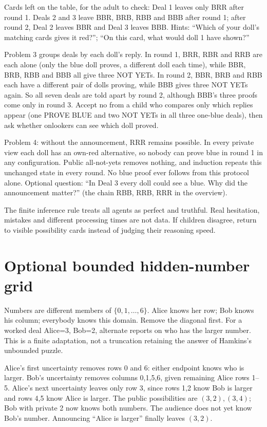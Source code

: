 \documentclass[11pt,letterpaper]{article}
\begin{document}
Cards left on the table, for the adult to check: Deal 1 leaves only BRR after round 1. Deals 2 and 3 leave BBR, BRB, RBB and BBB after round 1; after round 2, Deal 2 leaves BBR and Deal 3 leaves BBB. Hints: ``Which of your doll's matching cards gives it red?''; ``On this card, what would doll 1 have shown?''

Problem 3 groups deals by each doll's reply. In round 1, BRR, RBR and RRB are each alone (only the blue doll proves, a different doll each time), while BBR, BRB, RBB and BBB all give three NOT YETs. In round 2, BBR, BRB and RBB each have a different pair of dolls proving, while BBB gives three NOT YETs again. So all seven deals are told apart by round 2, although BBB's three proofs come only in round 3. Accept no from a child who compares only which replies appear (one PROVE BLUE and two NOT YETs in all three one-blue deals), then ask whether onlookers can see which doll proved.

Problem 4: without the announcement, RRR remains possible. In every private view each doll has an own-red alternative, so nobody can prove blue in round 1 in any configuration. Public all-not-yets removes nothing, and induction repeats this unchanged state in every round. No blue proof ever follows from this protocol alone. Optional question: ``In Deal 3 every doll could see a blue. Why did the announcement matter?'' (the chain RBB, RRB, RRR in the overview).

The finite inference rule treats all agents as perfect and truthful. Real hesitation, mistakes and different processing times are not data. If children disagree, return to visible possibility cards instead of judging their reasoning speed.
\newpage
\section*{Optional bounded hidden-number grid}
Numbers are different members of $\{0,1,\ldots,6\}$. Alice knows her row; Bob knows his column; everybody knows this domain. Remove the diagonal first. For a worked deal Alice=3, Bob=2, alternate reports on who has the larger number. This is a finite adaptation, not a truncation retaining the answer of Hamkins's unbounded puzzle.

Alice's first uncertainty removes rows 0 and 6: either endpoint knows who is larger. Bob's uncertainty removes columns 0,1,5,6, given remaining Alice rows 1--5. Alice's next uncertainty leaves only row 3, since rows 1,2 know Bob is larger and rows 4,5 know Alice is larger. The public possibilities are $(3,2),(3,4)$; Bob with private 2 now knows both numbers. The audience does not yet know Bob's number. Announcing ``Alice is larger'' finally leaves $(3,2)$.
\end{document}
